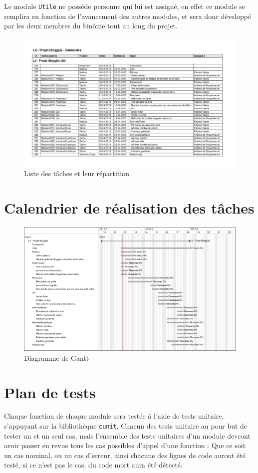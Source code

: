 \documentclass[12pt,a4paper,openany]{article}
\begin{document}
	Le module \texttt{Utile} ne possède personne qui lui est assigné, en effet ce module se remplira en fonction de l'avancement des autres modules, et sera donc
	développé par les deux membres du binôme tout au long du projet.
	\begin{figure}[H]
		\centering
		\includegraphics[angle=-90,width=15.2cm]{taches.pdf}
		\caption{Liste des tâches et leur répartition}
	\end{figure}
	\section{Calendrier de réalisation des tâches}
	\begin{figure}[H]
		\centering
		\includegraphics[angle=-90,width=14.2cm]{gantt.png}
		\caption{Diagramme de Gantt}
	\end{figure}
	\section{Plan de tests}
	Chaque fonction de chaque module sera testée à l'aide de tests unitaire, s'appuyant sur la bibliothèque \texttt{cunit}. Chacun des tests unitaire au pour but
	de tester un et un seul cas, mais l'ensemble des tests unitaires d'un module devront avoir passer en revue tous les cas possibles d'appel d'une fonction :
	Que ce soit un cas nominal, ou un cas d'erreur, ainsi chacune des lignes de code auront été testé, si ce n'est pas le cas, du code mort aura été détecté. 
\end{document}
